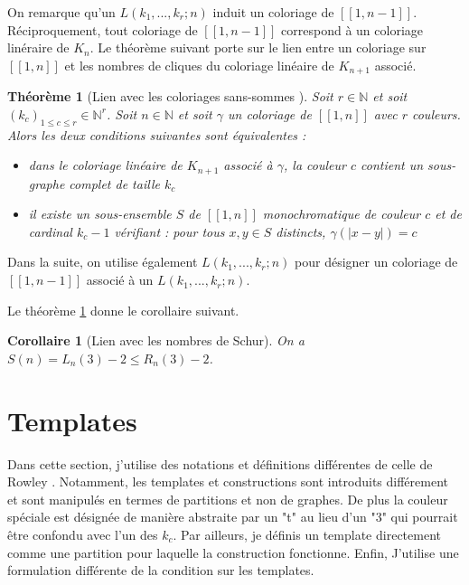 \documentclass{article}
\newtheorem{theorem}[definition]{Théorème}
\newtheorem{corollary}[definition]{Corollaire}
\begin{document}
On remarque qu'un \(L(k_1, ..., k_r ; n)\) induit un coloriage de \([\![1, n - 1]\!]\). Réciproquement, tout coloriage de \([\![1, n - 1]\!]\) correspond à un coloriage linéraire de \(K_n\). Le théorème suivant porte sur le lien entre un coloriage sur \([\![1, n]\!]\) et les nombres de cliques du coloriage linéaire de \(K_{n+1}\) associé.

\begin{theorem}[Lien avec les coloriages sans-sommes \cite{AbbottHanson}]
\label{thm:lien-partitions}
Soit \(r \in \mathbb{N}\) et soit \((k_c)_{1 \leqslant c \leqslant r} \in \mathbb{N}^r\). Soit \(n \in \mathbb{N}\) et soit \(\gamma\) un coloriage de \([\![1, n]\!]\) avec \(r\) couleurs. Alors les deux conditions suivantes sont équivalentes :
\begin{itemize}
\item dans le coloriage linéaire de \(K_{n+1}\) associé à \(\gamma\), la couleur \(c\) contient un sous-graphe complet de taille \(k_c\)
\item il existe un sous-ensemble \(S\) de \([\![1, n]\!]\) monochromatique de couleur \(c\) et de cardinal \(k_c - 1\) vérifiant : pour tous \(x, y \in S\) distincts, \(\gamma(|x - y|) = c\) 
\end{itemize}
\end{theorem}

Dans la suite, on utilise également \(L(k_1, ..., k_r ; n)\) pour désigner un coloriage de \([\![1, n - 1]\!]\)  associé à un \(L(k_1, ..., k_r ; n)\).

Le théorème \ref{thm:lien-partitions} donne le corollaire suivant.

\begin{corollary}[Lien avec les nombres de Schur]
On a \(S(n) = L_n(3) - 2 \leqslant R_n(3) - 2\). 
\end{corollary}

\section{Templates}
\label{sec:temp}

Dans cette section, j'utilise des notations et définitions différentes de celle de Rowley \cite{RowleyRamsey}. Notamment, les templates et constructions sont introduits différement et sont manipulés en termes de partitions et non de graphes. De plus la couleur spéciale est désignée de manière abstraite par un "t" au lieu d'un "3" qui pourrait être confondu avec l'un des \(k_c\). Par ailleurs, je définis un template directement comme une partition pour laquelle la construction fonctionne. Enfin, J'utilise une formulation différente de la condition sur les templates.
\end{document}
